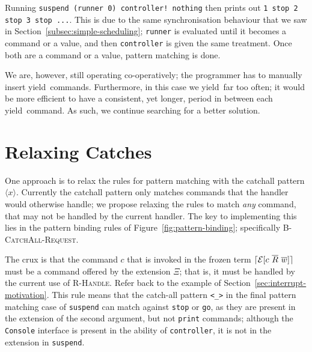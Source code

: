 \documentclass[msc,deptreport,cs]{infthesis} %
\newcommand{\code}[1]{\lstinline{#1}}
\newcommand\yield{\textsf{yield}\xspace}
\DeclarePairedDelimiter{\ceil}{\lceil}{\rceil}
\newcommand{\many}{\overline}
\newcommand{\adj}{\Delta}
\newcommand{\adapt}{\Theta}
\newcommand{\ext}{\Xi}
\newcommand{\sig}{I}
\newcommand{\effin}[1]{\langle {#1} \rangle}
\newcommand{\EC}{\mathcal{E}}
\newcommand{\freeze}{\ceil}
\newcommand{\pipe}{\texttt{|}}
\begin{document}
\noindent Running \code{suspend (runner 0) controller! nothing} then prints out
\code{1 stop 2 stop 3 stop ...}.
%
This is due to the same synchronisation behaviour that we saw in
Section~\ref{subsec:simple-scheduling}; \code{runner} is evaluated until it
becomes a command or a value, and then \code{controller} is given the same
treatment. Once both are a command or a value, pattern matching is done.


We are, however, still operating co-operatively; the programmer has to manually
insert \yield~commands. Furthermore, in this case we \yield~far too often; it would be more efficient to have a consistent, yet longer, period in between each \yield~command.
%
As such, we continue searching for a better solution.

\section{Relaxing Catches}
\label{sec:relaxing-catches}

One approach is to relax the rules for pattern matching with the catchall
pattern $\effin{x}$. Currently the catchall pattern only matches commands that
the handler would otherwise handle; we propose relaxing the rules to match
\emph{any} command, that may not be handled by the current handler. The key to
implementing this lies in the pattern binding rules of
Figure~\ref{fig:pattern-binding}; specifically \textsc{B-CatchAll-Request}.

%

The crux is that the command $c$ that is invoked in the frozen term
$\freeze{\EC[c~\many{R}~\many{w}]}$ must be a command offered by the extension
$\ext$; that is, it must be handled by the current use of \textsc{R-Handle}.
Refer back to the example of Section~\ref{sec:interrupt-motivation}. This
rule means that the catch-all pattern \code{<_>} in the final pattern matching
case of \code{suspend} can match against \code{stop} or \code{go}, as they are
present in the extension of the second argument, but not \code{print} commands;
although the \code{Console} interface is present in the ability of
\code{controller}, it is not in the extension in \code{suspend}.
\end{document}
